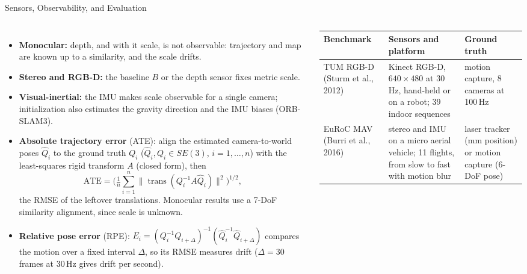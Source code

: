 \begin{frame}{Sensors, Observability, and Evaluation}
  \begin{columns}[T,onlytextwidth]
      \begin{itemize}\scriptsize\itemsep0.25em
        \item \textbf{Monocular:} depth, and with it scale, is not observable: trajectory and map are known up to a similarity, and the scale drifts.
        \item \textbf{Stereo and RGB-D:} the baseline $B$ or the depth sensor fixes metric scale.
        \item \textbf{Visual-inertial:} the IMU makes scale observable for a single camera; initialization also estimates the gravity direction and the IMU biases (ORB-SLAM3).
        \item \textbf{Absolute trajectory error} (ATE): align the estimated camera-to-world poses $\hat{Q}_i$ to the ground truth $Q_i$ ($\hat{Q}_i,Q_i\in SE(3)$, $i=1,\dots,n$) with the least-squares rigid transform $A$ (closed form), then
        \[ \mathrm{ATE} = \Big(\tfrac{1}{n}\textstyle\sum_{i=1}^{n}\lVert\operatorname{trans}(Q_i^{-1}A\hat{Q}_i)\rVert^2\Big)^{1/2}, \]
        the RMSE of the leftover translations. Monocular results use a 7-DoF similarity alignment, since scale is unknown.
        \item \textbf{Relative pose error} (RPE): $E_i=(Q_i^{-1}Q_{i+\Delta})^{-1}(\hat{Q}_i^{-1}\hat{Q}_{i+\Delta})$ compares the motion over a fixed interval $\Delta$, so its RMSE measures drift ($\Delta=30$ frames at 30\,Hz gives drift per second).
      \end{itemize}
      \vspace{0.2em}
      {\centering\scriptsize\setlength{\tabcolsep}{3pt}
      \begin{tabular}{>{\raggedright\arraybackslash}p{1.5cm} >{\raggedright\arraybackslash}p{2.8cm} >{\raggedright\arraybackslash}p{2.2cm}}
        \toprule
        \textbf{Benchmark} & \textbf{Sensors and platform} & \textbf{Ground truth} \\
        \midrule
        TUM RGB-D (Sturm et al., 2012) & Kinect RGB-D, $640\times480$ at 30\,Hz, hand-held or on a robot; 39 indoor sequences & motion capture, 8 cameras at 100\,Hz \\
        \addlinespace[0.2em]
        EuRoC MAV (Burri et al., 2016) & stereo and IMU on a micro aerial vehicle; 11 flights, from slow to fast with motion blur & laser tracker (mm position) or motion capture (6-DoF pose) \\

\end{tabular}}
\end{columns}
\end{frame}
